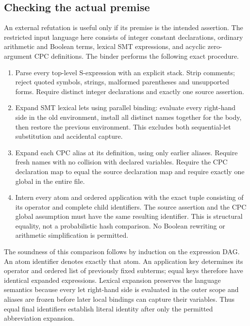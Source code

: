 \subsection{Checking the actual premise}
An external refutation is useful only if its premise is the intended assertion. The restricted input language here consists of integer constant declarations, ordinary arithmetic and Boolean terms, lexical SMT  expressions, and acyclic zero-argument CPC definitions. The binder  performs the following exact procedure.
\begin{enumerate}
\item Parse every top-level S-expression with an explicit stack. Strip comments; reject quoted symbols, strings, malformed parentheses and unsupported forms. Require distinct integer declarations and exactly one source assertion.
\item Expand SMT lexical lets using parallel binding: evaluate every right-hand side in the old environment, install all distinct names together for the body, then restore the previous environment. This excludes both sequential-let substitution and accidental capture.
\item Expand each CPC alias at its definition, using only earlier aliases. Require fresh names with no collision with declared variables. Require the CPC declaration map to equal the source declaration map and require exactly one global  in the entire file.
\item Intern every atom and ordered application with the exact tuple consisting of its operator and complete child identifiers. The source assertion and the CPC global assumption must have the same resulting identifier. This is structural equality, not a probabilistic hash comparison. No Boolean rewriting or arithmetic simplification is permitted.
\end{enumerate}

The soundness of this comparison follows by induction on the expression DAG. An atom identifier denotes exactly that atom. An application key determines its operator and ordered list of previously fixed subterms; equal keys therefore have identical expanded expressions. Lexical expansion preserves the language semantics because every let right-hand side is evaluated in the outer scope and aliases are frozen before later local bindings can capture their variables. Thus equal final identifiers establish literal identity after only the permitted abbreviation expansion.


